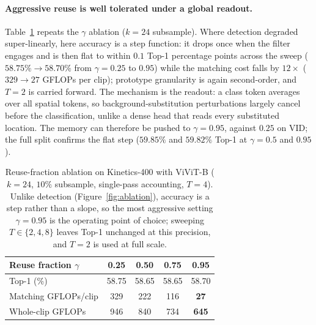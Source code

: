 \documentclass[letterpaper]{article}
\begin{document}
\paragraph{Aggressive reuse is well tolerated under a global readout.}
Table~\ref{tab:k400-ablation} repeats the $\gamma$ ablation
($k = 24$ subsample). Where detection degraded super-linearly, here
accuracy is a step function: it drops once when the filter engages and
is then flat to within $0.1$ Top-1 percentage points across the sweep
($58.75\% \rightarrow 58.70\%$ from $\gamma = 0.25$ to $0.95$) while
the matching cost falls by $12\times$ ($329 \rightarrow 27$ GFLOPs per
clip); prototype granularity is again second-order, and $T = 2$ is
carried forward. The mechanism is the readout: a class token averages over all spatial
tokens, so background-substitution perturbations largely cancel before
the classification, unlike a dense head that reads every substituted
location. The memory can therefore be pushed to $\gamma = 0.95$,
against $0.25$ on VID; the full split confirms the flat step
($59.85\%$ and $59.82\%$ Top-1 at $\gamma = 0.5$ and $0.95$).

\begin{table}[t]
\centering
\footnotesize
\setlength{\tabcolsep}{5pt}
\begin{tabular}{lcccc}
\toprule
Reuse fraction $\gamma$ & 0.25 & 0.50 & 0.75 & 0.95 \\
\midrule
Top-1 (\%)              & 58.75 & 58.65 & 58.65 & 58.70 \\
Matching GFLOPs/clip    & 329   & 222   & 116   & \textbf{27} \\
Whole-clip GFLOPs       & 946   & 840   & 734   & \textbf{645} \\
\bottomrule
\end{tabular}
\caption{Reuse-fraction ablation on Kinetics-400 with ViViT-B ($k = 24$,
$10\%$ subsample, single-pass accounting, $T = 4$). Unlike detection
(Figure~\ref{fig:ablation}), accuracy is a step rather than a slope, so
the most aggressive setting $\gamma = 0.95$ is the operating point of
choice; sweeping $T \in \{2, 4, 8\}$ leaves Top-1 unchanged at this
precision, and $T = 2$ is used at full scale.}
\label{tab:k400-ablation}
\end{table}
\end{document}
